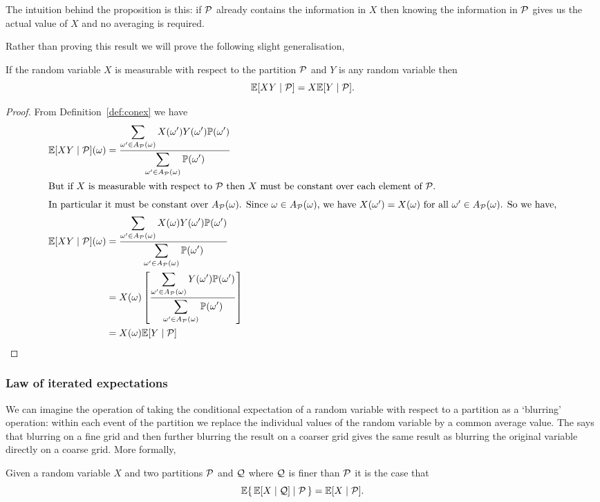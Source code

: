 \documentclass[11pt,reqno,openany]{amsbook}
\begin{document}
The intuition behind the proposition is this: if
$\mathcal{P}$ already contains the information in $X$ then
knowing the information in $\mathcal{P}$ gives us the actual
value of $X$ and no averaging is required.

Rather than proving this result we will prove the following
slight generalisation,

\begin{prop}\label{prop:conex-measure-gen}
  If the random variable $X$ is measurable with respect to
  the partition $\mathcal{P}$ and $Y$ is any random variable then
  \[\mathbb{E}[XY\mid \mathcal{P}]=X\mathbb{E}[Y \mid \mathcal{P}].\]
\end{prop}
\begin{proof}
  From Definition~\ref{def:conex} we have
  \begin{align*}
  \mathbb{E}[XY\mid\mathcal{P}](\omega) 
  &= \frac{\displaystyle \sum_{\omega' \in A_{\mathcal{P}}(\omega)} 
    X(\omega')Y(\omega')\mathbb{P}(\omega')}
  {\displaystyle\sum_{\omega' \in A_{\mathcal{P}}(\omega)} 
    \mathbb{P}(\omega')}\\
  \intertext{But if $X$ is measurable with respect to
    $\mathcal{P}$ then $X$ must be constant over each element
    of $\mathcal{P}$.}
  \intertext{In particular it must be constant over
    $A_{\mathcal{P}}(\omega)$. Since $\omega \in
    A_{\mathcal{P}}(\omega)$, we have
    $X(\omega')=X(\omega)$ for all $\omega' \in
    A_{\mathcal{P}}(\omega)$.  So we have,}
  \mathbb{E}[XY\mid\mathcal{P}](\omega)
  &= \frac{\displaystyle \sum_{\omega' \in A_{\mathcal{P}}(\omega)} 
    X(\omega)Y(\omega')\mathbb{P}(\omega')}
  {\displaystyle\sum_{\omega' \in A_{\mathcal{P}}(\omega)} 
    \mathbb{P}(\omega')}\\
  &= X(\omega)\left[\frac{\displaystyle \sum_{\omega' \in A_{\mathcal{P}}(\omega)} 
    Y(\omega')\mathbb{P}(\omega')}
  {\displaystyle\sum_{\omega' \in A_{\mathcal{P}}(\omega)} 
    \mathbb{P}(\omega')}\right]\\
  &= X(\omega)\mathbb{E}[Y \mid \mathcal{P}]
  \end{align*}
\end{proof}

\subsubsection{Law of iterated expectations}
We can imagine the operation of taking the conditional
expectation of a random variable with respect to a partition
as a `blurring' operation: within each event of the
partition we replace the individual values of the random
variable by a common average value. The  says that blurring on a fine grid and then
further blurring the result on a coarser grid gives the same result as
blurring the original variable directly on a coarse grid.
More formally,
\begin{thm}
  Given a random variable $X$ and two partitions $\mathcal{P}$
  and $\mathcal{Q}$ where $\mathcal{Q}$ is finer than
  $\mathcal{P}$ it is the case that
  \[\mathbb{E}\{\,\mathbb{E}[X \mid \mathcal{Q}] \mid \mathcal{P}\,\}
  = \mathbb{E}[X \mid \mathcal{P}].\]
\end{thm}
\end{document}
